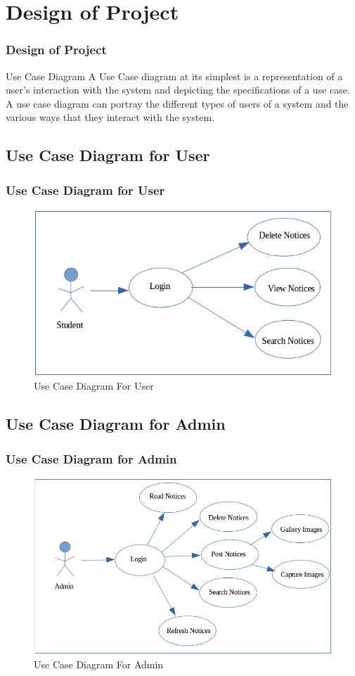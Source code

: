 \documentclass{beamer}   %
\begin{document}
\section{Design of Project}
\begin{frame}
\frametitle{Design of Project}
\begin{block}{Use Case Diagram}
A Use Case diagram at its simplest is a representation of a user’s interaction with the system and
depicting the specifications of a use case. A use case diagram can portray the different types of users of a
system and the various ways that they interact with the system.
\end{block}
\end{frame}

\subsection{Use Case Diagram for User}
\begin{frame}
\frametitle{Use Case Diagram for User}
\begin{figure}
\includegraphics[scale=0.4]{image/usecase1.png}
\caption{Use Case Diagram For User}
\end{figure}
\end{frame}

\subsection{Use Case Diagram for Admin}
\begin{frame}
\frametitle{Use Case Diagram for Admin}
\begin{figure}
\includegraphics[scale=0.3]{image/usecase2.png}
\caption{Use Case Diagram For Admin}
\end{figure}
\end{frame}
\end{document}
